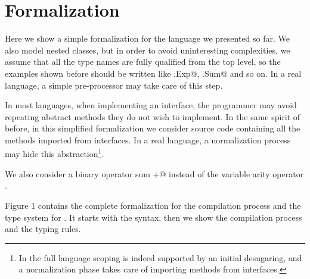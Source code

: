 \saveSpace\saveSpace\section{Formalization}\label{sec:formal}
\saveSpace\saveSpace

Here we show a simple formalization for the language we presented so far.
We also model nested classes, but in order to avoid uninteresting complexities, we assume that
all the type names are fully qualified from the top level, so the examples shown before should be
written like \Q@This.Exp@, \Q@This.Sum@ and so on.
In a real language, a simple pre-processor may take care of this step.

In most languages, when implementing an interface, the programmer may avoid repeating abstract methods
they do not wish to implement.
In the same spirit of before, in this simplified formalization we consider source code containing
all the methods imported from interfaces. In a real language, a normalization process
may hide this abstraction\footnote{
In the full language scoping is indeed supported by an initial desugaring, and a normalization phase takes care of importing methods from interfaces.
}.

We also consider a binary operator sum \Q@+@ instead of the variable arity operator \Q@use@.

Figure 1 contains the complete formalization for the 
compilation process and the type system for \name.
It starts with the syntax, then
we show the compilation process and the typing rules.




